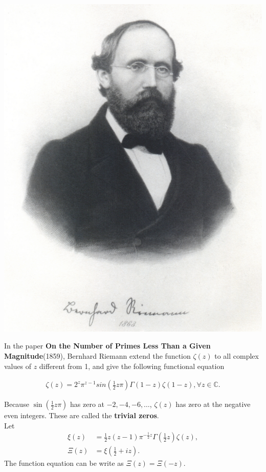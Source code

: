 \documentclass{beamer}
\newcommand{\C}{\mathbb C }
\begin{document}
\frame
{
\begin{center}
\includegraphics[scale=0.1]{pics/Riemann.pdf}
\end{center}
In the paper \textbf{On the Number of Primes Less Than a Given Magnitude}(1859), 
Bernhard Riemann extend the function $\zeta(z)$ to all complex values of 
$z$ different from 1, and give the following functional equation
}

\frame
{
\begin{align*}
\zeta(z) = 2^{z}\pi^{z-1}sin(\frac{1}{2}z\pi)\Gamma(1-z)\zeta(1-z),  \forall z \in \C.
\end{align*}

Because $\sin(\frac{1}{2}z\pi)$ has zero at $-2, -4, -6,\ldots$, $\zeta(z)$ has zero at the 
negative even integers. These are called the \textbf{trivial zeros}. \\

Let
\begin{align*}
\xi(z) &= \frac{1}{2}z(z-1)\pi^{-\frac{1}{2}z}\Gamma(\frac{1}{2}z)\zeta(z), \\
\Xi(z) &= \xi(\frac{1}{2} + iz).
\end{align*}
The function equation can be write as $\Xi(z) = \Xi(-z)$.
}
\end{document}
